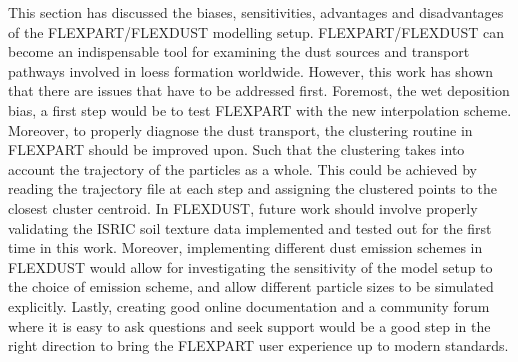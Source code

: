 This section has discussed the biases, sensitivities, advantages and disadvantages of the FLEXPART/FLEXDUST modelling setup. 
FLEXPART/FLEXDUST can become an indispensable tool for examining the dust sources and transport pathways involved in loess formation worldwide. 
However, this work has shown that there are issues that have to be addressed first. 
Foremost, the wet deposition bias, a first step would be to test FLEXPART with the new interpolation scheme. 
Moreover, to properly diagnose the dust transport, the clustering routine in FLEXPART should be improved upon. Such that the clustering takes into account the trajectory of the particles as a whole. 
This could be achieved by reading the trajectory file at each step and assigning the clustered points to the closest cluster centroid. 
In FLEXDUST, future work should involve properly validating the ISRIC soil texture data implemented and tested out for the first time in this work. 
Moreover, implementing different dust emission schemes in FLEXDUST would allow for investigating the sensitivity of the model setup to the choice of emission scheme, and allow different particle sizes to be simulated explicitly.
Lastly, creating good online documentation and a community forum where it is easy to ask questions and seek support would be a good step in the right direction to bring the FLEXPART user experience up to modern standards.